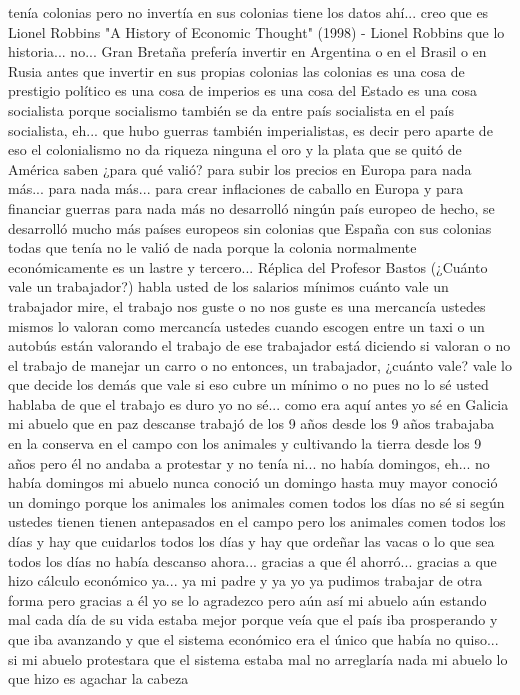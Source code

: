 tenía colonias pero no invertía en sus colonias tiene los datos ahí... creo que es Lionel Robbins
"A History of Economic Thought" (1998) - Lionel Robbins
que lo historia... no... Gran Bretaña prefería invertir en Argentina o en el Brasil
o en Rusia antes que invertir en sus propias colonias las colonias es una cosa de prestigio político es una cosa de imperios es una cosa del Estado
es una cosa socialista porque socialismo también se da entre país socialista
en el país socialista, eh... que hubo guerras también imperialistas, es decir pero aparte de eso el colonialismo no da riqueza ninguna
el oro y la plata que se quitó de América saben ¿para qué valió? para subir los precios en Europa para nada más...
para nada más... para crear inflaciones de caballo en Europa y para financiar guerras para nada más no desarrolló ningún país europeo
de hecho, se desarrolló mucho más países europeos sin colonias que España con sus colonias todas que tenía
no le valió de nada porque la colonia normalmente económicamente es un lastre y tercero...
Réplica del Profesor Bastos (¿Cuánto vale un trabajador?)
habla usted de los salarios mínimos cuánto vale un trabajador mire, el trabajo nos guste o no nos guste
es una mercancía ustedes mismos lo valoran como mercancía ustedes cuando escogen entre un taxi
o un autobús están valorando el trabajo de ese trabajador está diciendo si valoran o no el trabajo de manejar un carro o no
entonces, un trabajador, ¿cuánto vale? vale lo que decide los demás que vale si eso cubre un mínimo o no
pues no lo sé usted hablaba de que el trabajo es duro yo no sé... como era aquí antes yo sé en Galicia mi abuelo
que en paz descanse trabajó de los 9 años desde los 9 años trabajaba en la conserva
en el campo con los animales y cultivando la tierra desde los 9 años
pero él no andaba a protestar y no tenía ni... no había domingos, eh... no había domingos mi abuelo nunca conoció un domingo
hasta muy mayor conoció un domingo porque los animales los animales comen todos los días
no sé si según ustedes tienen tienen antepasados en el campo pero los animales comen todos los días y hay que cuidarlos todos los días
y hay que ordeñar las vacas o lo que sea todos los días no había descanso ahora... gracias a que él ahorró...
gracias a que hizo cálculo económico ya... ya mi padre y ya yo ya pudimos trabajar de otra forma
pero gracias a él yo se lo agradezco pero aún así mi abuelo aún estando mal cada día de su vida estaba mejor
porque veía que el país iba prosperando y que iba avanzando y que el sistema económico era el único que había
no quiso... si mi abuelo protestara que el sistema estaba mal no arreglaría nada mi abuelo lo que hizo es agachar la cabeza
